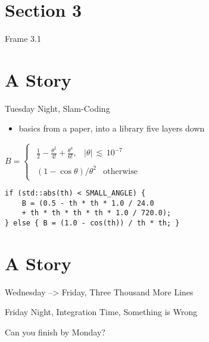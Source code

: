 \documentclass[presentation]{beamer}
\begin{document}
\section{Section 3}
\label{sec:org1e16d0b}

\begin{frame}[label={sec:org0f8a30e}]{Frame 3.1}
\end{frame}

\section{A Story}
\label{sec:org69472a8}
\begin{frame}[fragile,label={sec:org595f858}]{Tuesday Night, Slam-Coding}
 \begin{itemize}
\item basics from a paper, into a library five layers down
\end{itemize}

$B=\begin{cases} \begin{matrix} \frac { 1 }{ 2 } -\frac { \theta ^{ 2 } }{ 4! }
+\frac { \theta ^{ 4 } }{ 6! } , & | \theta | \, \lesssim \, 10^{ -7 } \end{matrix}
\\ \begin{matrix} { \left( 1-\cos { \theta  }  \right)  }/{ { \theta  }^{ 2 } }
& \mathrm{otherwise} \quad  \end{matrix} \end{cases}$

\begin{verbatim}
if (std::abs(th) < SMALL_ANGLE) {
    B = (0.5 - th * th * 1.0 / 24.0
    + th * th * th * th * 1.0 / 720.0);
} else { B = (1.0 - cos(th)) / th * th; }
\end{verbatim}
\end{frame}



\section{A Story}
\label{sec:org72440ae}
\begin{frame}[label={sec:org3b17bc2}]{Wednesday --> Friday, Three Thousand More Lines}
\end{frame}
\begin{frame}[label={sec:orgd654bde}]{Friday Night, Integration Time, Something is Wrong}
\begin{block}{Can you finish by Monday?}
\end{block}
\end{frame}
\end{document}
